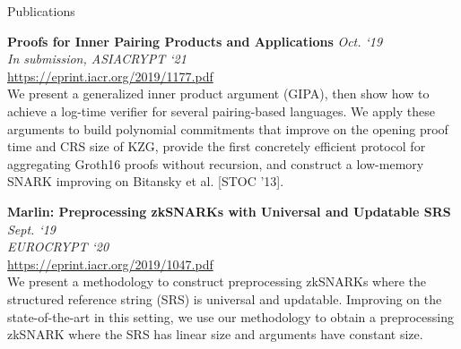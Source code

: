 \documentclass{cv}
\begin{document}
\begin{rSection}{Publications}

\textbf{Proofs for Inner Pairing Products and Applications} \hfill \emph{Oct. `19} \\
\emph{In submission, ASIACRYPT `21} \\
\url{https://eprint.iacr.org/2019/1177.pdf} \\
{\small We present a generalized inner product argument (GIPA), then show how
to achieve a log-time verifier for several pairing-based languages. We apply
these arguments to build polynomial commitments that improve on the opening
proof time and CRS size of KZG, provide the first concretely efficient protocol for aggregating Groth16 proofs without recursion, and construct a low-memory SNARK improving on Bitansky et al. [STOC '13].}

\textbf{Marlin: Preprocessing zkSNARKs with Universal and Updatable SRS} \hfill \emph{Sept. `19} \\
\emph{EUROCRYPT `20} \\
\url{https://eprint.iacr.org/2019/1047.pdf} \\
{\small We present a methodology to construct preprocessing zkSNARKs where the structured reference string (SRS) is universal and updatable. Improving on the state-of-the-art in this setting, we use our methodology to obtain a preprocessing zkSNARK where the SRS has linear size and arguments have constant size.}

\end{rSection}

\end{document}
